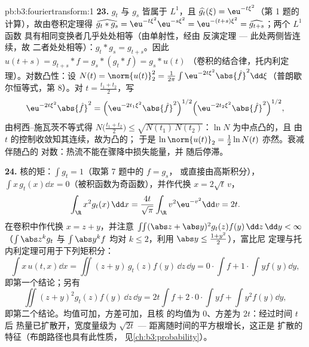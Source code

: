 \begin{solution}{pb:b3:fouriertransform:1}
\textbf{23.} $g_t$ 与 $g_s$ 皆属于 $L^1$，且
$\widehat{g_t}(\xi) = \eu^{-t\xi^2}$（第 1 题的
计算），故由卷积定理得
$\widehat{g_t * g_s} = \eu^{-t\xi^2}\eu^{-s\xi^2} =
\eu^{-(t+s)\xi^2} = \widehat{g_{t+s}}$；两个 $L^1$ 函数
具有相同变换者几乎处处相等（由单射性，经由
反演定理 --- 此处两侧皆连续，故
二者处处相等）：$g_t * g_s = g_{t+s}$。因此
$u(t + s) = g_{t+s} * f = g_s * (g_t * f) = g_s * u(t)$
（卷积的结合律，托内利定理）。对数凸性：设
$N(t) = \norm{u(t)}_2^2 = \frac1{2\pi}\int
\eu^{-2t\xi^2}\abs{\hat f}^2\dd\xi$（普朗歇尔恒等式，第
8）。对 $t = \frac{t_1 + t_2}2$，写
\[
\eu^{-2t\xi^2}\abs{\hat f}^2
= \Bigl(\eu^{-2t_1\xi^2}\abs{\hat f}^2\Bigr)^{1/2}
\Bigl(\eu^{-2t_2\xi^2}\abs{\hat f}^2\Bigr)^{1/2},
\]
由柯西–施瓦茨不等式得 $N\bigl(\frac{t_1+t_2}2\bigr) \leq
\sqrt{N(t_1)\,N(t_2)}$：$\ln N$ 为中点凸的，且
由 $t$ 的控制收敛知其连续，故为凸的；
于是 $\ln\norm{u(t)}_2 = \frac12\ln N(t)$ 亦然。衰减伴随凸的
对数：热流不能在骤降中损失能量，并
随后停滞。

\textbf{24.} 核的矩：$\int g_t = 1$（取第 7 题中的 $f = g_s$，
或直接由高斯积分），$\int
x\,g_t(x)\dd x = 0$（被积函数为奇函数），并作代换 $x =
2\sqrt t\,v$，
\[
\int_\R x^2g_t(x)\,\dd x
= \frac{4t}{\sqrt\pi}\int_\R v^2\eu^{-v^2}\dd v = 2t .
\]
在卷积中作代换 $x = z + y$，并注意
$\iint(\abs z + \abs y)^2g_t(z)f(y)\,\dd z\,\dd y < \infty$
（$\int\abs z^kg_t$ 与 $\int\abs y^kf$ 均对 $k
\leq 2$，利用 $\abs y \leq \frac{1 + y^2}2$），富比尼
定理与托内利定理可用于下列矩积分：
\[
\int x\,u(t,x)\dd x = \iint (z + y)\,g_t(z)f(y)\,\dd z\,\dd
y = 0\cdot\!\int\! f + 1\cdot\!\int\! yf(y)\dd y,
\]
即第一个结论；另有
\[
\iint (z+y)^2g_t(z)f(y)\,\dd z\,\dd y
= 2t\int f + 2\cdot0\cdot\!\int\! yf + \int y^2f(y)\dd y ,
\]
即第二个结论。均值可加，方差可加，且核
的均值为 $0$、方差为 $2t$：经过时间 $t$ 后
热量已扩散开，宽度量级为 $\sqrt{2t}$ ---
距离随时间的平方根增长，这正是
扩散的特征（布朗路径也具有此性质，
见\cref{ch:b3:probability}）。


\end{solution}
